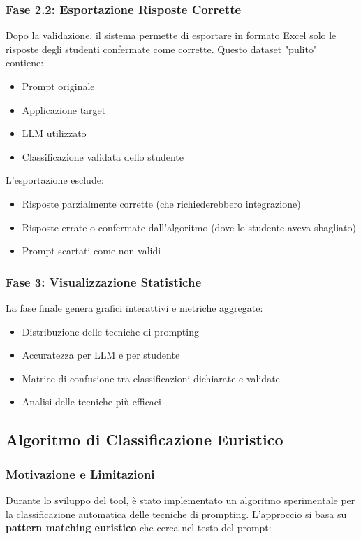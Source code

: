 \documentclass[a4paper,12pt]{article}
\begin{document}
\subsubsection{Fase 2.2: Esportazione Risposte Corrette}
Dopo la validazione, il sistema permette di esportare in formato Excel solo le risposte degli studenti confermate come corrette. Questo dataset "pulito" contiene:
\begin{itemize}
    \item Prompt originale
    \item Applicazione target
    \item LLM utilizzato
    \item Classificazione validata dello studente
\end{itemize}

L'esportazione esclude:
\begin{itemize}
    \item Risposte parzialmente corrette (che richiederebbero integrazione)
    \item Risposte errate o confermate dall'algoritmo (dove lo studente aveva sbagliato)
    \item Prompt scartati come non validi
\end{itemize}

\subsubsection{Fase 3: Visualizzazione Statistiche}
La fase finale genera grafici interattivi e metriche aggregate:
\begin{itemize}
    \item Distribuzione delle tecniche di prompting
    \item Accuratezza per LLM e per studente
    \item Matrice di confusione tra classificazioni dichiarate e validate
    \item Analisi delle tecniche più efficaci
\end{itemize}

\subsection{Algoritmo di Classificazione Euristico}

\subsubsection{Motivazione e Limitazioni}
Durante lo sviluppo del tool, è stato implementato un algoritmo sperimentale per la classificazione automatica delle tecniche di prompting. L'approccio si basa su \textbf{pattern matching euristico} che cerca nel testo del prompt:
\end{document}
